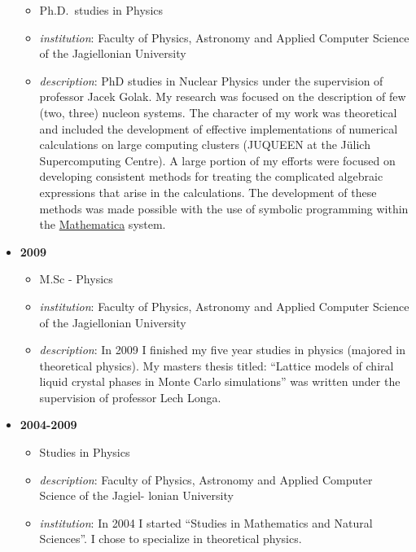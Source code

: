 \documentclass{article}
\providecommand{\tightlist}{%
  \setlength{\itemsep}{0pt}\setlength{\parskip}{0pt}}
\begin{document}
\begin{itemize}
  \begin{itemize}
  \tightlist
  \item
    Ph.D.~studies in Physics
  \item
    \emph{institution}: Faculty of Physics, Astronomy and Applied
    Computer Science of the Jagiellonian University
  \item
    \emph{description}: PhD studies in Nuclear Physics under the
    supervision of professor Jacek Golak. My research was focused on the
    description of few (two, three) nucleon systems. The character of my
    work was theoretical and included the development of effective
    implementations of numerical calculations on large computing
    clusters (JUQUEEN at the Jülich Supercomputing Centre). A large
    portion of my efforts were focused on developing consistent methods
    for treating the complicated algebraic expressions that arise in the
    calculations. The development of these methods was made possible
    with the use of symbolic programming within the
    \href{https://www.wolfram.com/mathematica/}{Mathematica} system.
  \end{itemize}
\item
  \textbf{2009}

  \begin{itemize}
  \tightlist
  \item
    M.Sc - Physics
  \item
    \emph{institution}: Faculty of Physics, Astronomy and Applied
    Computer Science of the Jagiellonian University
  \item
    \emph{description}: In 2009 I finished my five year studies in
    physics (majored in theoretical physics). My masters thesis titled:
    ``Lattice models of chiral liquid crystal phases in Monte Carlo
    simulations'' was written under the supervision of professor Lech
    Longa.
  \end{itemize}
\item
  \textbf{2004-2009}

  \begin{itemize}
  \tightlist
  \item
    Studies in Physics
  \item
    \emph{description}: Faculty of Physics, Astronomy and Applied
    Computer Science of the Jagiel- lonian University
  \item
    \emph{institution}: In 2004 I started ``Studies in Mathematics and
    Natural Sciences''. I chose to specialize in theoretical physics.
  \end{itemize}
\end{itemize}
\end{document}
